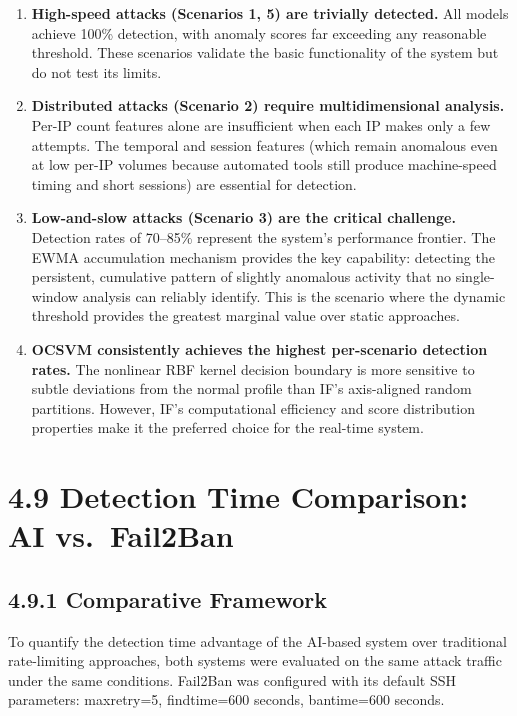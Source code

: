\documentclass[
  a4paper]{report}
\begin{document}
\begin{enumerate}
\def\labelenumi{\arabic{enumi}.}
\item
  \textbf{High-speed attacks (Scenarios 1, 5) are trivially detected.}
  All models achieve 100\% detection, with anomaly scores far exceeding
  any reasonable threshold. These scenarios validate the basic
  functionality of the system but do not test its limits.
\item
  \textbf{Distributed attacks (Scenario 2) require multidimensional
  analysis.} Per-IP count features alone are insufficient when each IP
  makes only a few attempts. The temporal and session features (which
  remain anomalous even at low per-IP volumes because automated tools
  still produce machine-speed timing and short sessions) are essential
  for detection.
\item
  \textbf{Low-and-slow attacks (Scenario 3) are the critical challenge.}
  Detection rates of 70--85\% represent the system's performance
  frontier. The EWMA accumulation mechanism provides the key capability:
  detecting the persistent, cumulative pattern of slightly anomalous
  activity that no single-window analysis can reliably identify. This is
  the scenario where the dynamic threshold provides the greatest
  marginal value over static approaches.
\item
  \textbf{OCSVM consistently achieves the highest per-scenario detection
  rates.} The nonlinear RBF kernel decision boundary is more sensitive
  to subtle deviations from the normal profile than IF's axis-aligned
  random partitions. However, IF's computational efficiency and score
  distribution properties make it the preferred choice for the real-time
  system.
\end{enumerate}

\section{4.9 Detection Time Comparison: AI
vs.~Fail2Ban}\label{detection-time-comparison-ai-vs.-fail2ban}

\subsection{4.9.1 Comparative Framework}\label{comparative-framework}

To quantify the detection time advantage of the AI-based system over
traditional rate-limiting approaches, both systems were evaluated on the
same attack traffic under the same conditions. Fail2Ban was configured
with its default SSH parameters: maxretry=5, findtime=600 seconds,
bantime=600 seconds.
\end{document}
